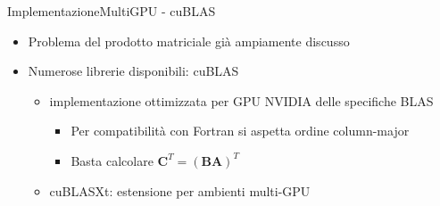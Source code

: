 \documentclass{beamer}
\begin{document}
\begin{frame}{Implementazione}{MultiGPU - cuBLAS}
    \begin{itemize}
        \item Problema del prodotto matriciale già ampiamente discusso
        \item Numerose librerie disponibili: \alert{cuBLAS}
              \begin{itemize}
                  \item implementazione ottimizzata per GPU NVIDIA delle specifiche BLAS
                        \begin{itemize}
                            \item Per compatibilità con Fortran si aspetta ordine column-major
                            \item Basta calcolare $\mathbf{C}^T=(\mathbf{B}\mathbf{A})^T$
                        \end{itemize}
                  \item \alert{cuBLASXt}: estensione per ambienti multi-GPU
              \end{itemize}
    \end{itemize}
\end{frame}
\end{document}
